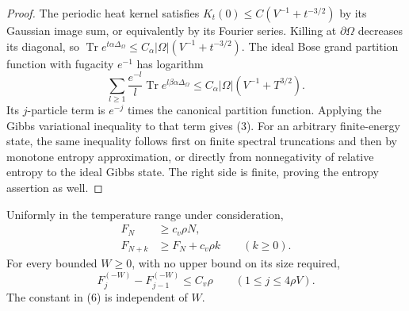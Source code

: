 \begin{proof}
The periodic heat kernel satisfies
$K_t(0)\leq C(V^{-1}+t^{-3/2})$ by its Gaussian image sum,
or equivalently by its Fourier series. Killing at $\partial\Omega$
decreases its diagonal, so
$\operatorname{Tr}e^{t\alpha\Delta_\Omega}
\leq C_\alpha|\Omega|(V^{-1}+t^{-3/2})$.
The ideal Bose grand partition function with fugacity $e^{-1}$ has
logarithm
\[
 \sum_{l\geq1}\frac{e^{-l}}l
 \operatorname{Tr}e^{l\beta\alpha\Delta_\Omega}
 \leq C_\alpha|\Omega|(V^{-1}+T^{3/2}).
\]
Its $j$-particle term is $e^{-j}$ times the canonical partition
function. Applying the Gibbs variational inequality to that term
gives (3). For an arbitrary finite-energy state, the same inequality
follows first on finite spectral truncations and then by monotone
entropy approximation, or directly from nonnegativity of relative
entropy to the ideal Gibbs state. The right side is finite, proving
the entropy assertion as well.
\end{proof}

\begin{proposition}\label{prop:increments}
Uniformly in the temperature range under consideration,
\begin{align}
 F_N&\geq c_v\rho N,\tag{4}\label{eq:4}\\
 F_{N+k}&\geq F_N+c_v\rho k\qquad(k\geq0).\tag{5}\label{eq:5}
\end{align}
For every bounded $W\geq0$, with no upper bound on its size required,
\begin{equation}
 F_j^{(-W)}-F_{j-1}^{(-W)}\leq C_v\rho
 \qquad(1\leq j\leq4\rho V).\tag{6}\label{eq:6}
\end{equation}
The constant in (6) is independent of $W$.
\end{proposition}

